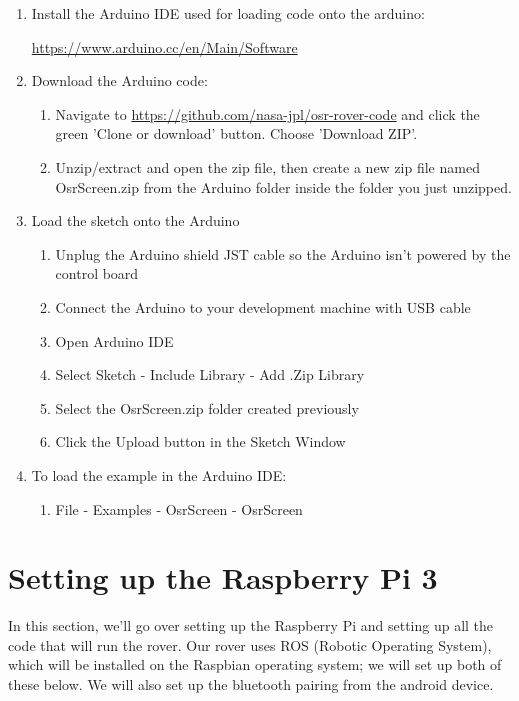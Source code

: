 \documentclass{article}
\begin{document}
\begin{enumerate} 
\item Install the Arduino IDE used for loading code onto the arduino:

	\href{https://www.arduino.cc/en/Main/Software}{https://www.arduino.cc/en/Main/Software}

\item Download the Arduino code:
	\begin{enumerate}
	\item Navigate to \href{https://github.com/nasa-jpl/osr-rover-code}{https://github.com/nasa-jpl/osr-rover-code} and click the green 'Clone or download' button. Choose 'Download ZIP'.
	\item Unzip/extract and open the zip file, then create a new zip file named OsrScreen.zip from the Arduino folder inside the folder you just unzipped.
	\end{enumerate}

\item Load the sketch onto the Arduino
	\begin{enumerate}
	\item Unplug the Arduino shield JST cable so the Arduino isn't powered by the control board
	\item Connect the Arduino to your development machine with USB cable
	\item Open Arduino IDE
	\item Select Sketch - Include Library - Add .Zip Library
	\item Select the OsrScreen.zip folder created previously
	\item Click the Upload button in the Sketch Window
	\end{enumerate}

\item To load the example in the Arduino IDE:
	\begin{enumerate}
	\item File - Examples - OsrScreen - OsrScreen
	\end{enumerate}

\end{enumerate}

\section{Setting up the Raspberry Pi 3}
In this section, we'll go over setting up the Raspberry Pi and setting up all the code that will run the rover. Our rover uses ROS (Robotic Operating System), which will be installed on the Raspbian operating system; we will set up both of these below.  We will also set up the bluetooth pairing from the android device.
\end{document}
